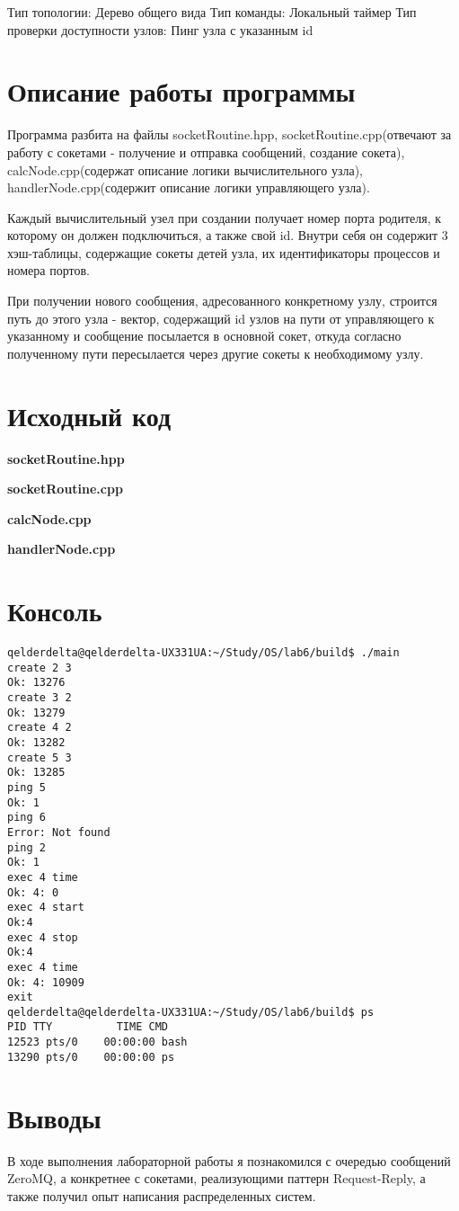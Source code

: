\documentclass[a4paper, 12pt]{article}
\begin{document}
Тип топологии: Дерево общего вида
Тип команды: Локальный таймер
Тип проверки доступности узлов: Пинг узла с указанным id

\section{Описание работы программы}

Программа разбита на файлы socketRoutine.hpp, socketRoutine.cpp(отвечают за работу с сокетами - получение и отправка сообщений, создание сокета), calcNode.cpp(содержат описание логики вычислительного узла), handlerNode.cpp\linebreak(содержит описание логики управляющего узла).

Каждый вычислительный узел при создании получает номер порта родителя, к которому он должен подключиться, а также свой id. Внутри себя он содержит 3 хэш-таблицы, содержащие сокеты детей узла, их идентификаторы процессов и номера портов.

При получении нового сообщения, адресованного конкретному узлу, строится путь до этого узла - вектор, содержащий id узлов на пути от управляющего к указанному и сообщение посылается в основной сокет, откуда согласно полученному пути пересылается через другие сокеты к необходимому узлу.
\newpage

\section{Исходный код}
\textbf{\large{socketRoutine.hpp}}


\textbf{\large{socketRoutine.cpp}}


\textbf{\large{calcNode.cpp}}


\textbf{\large{handlerNode.cpp}}

\newpage
\section{Консоль}

\begin{verbatim}
qelderdelta@qelderdelta-UX331UA:~/Study/OS/lab6/build$ ./main
create 2 3
Ok: 13276
create 3 2
Ok: 13279
create 4 2
Ok: 13282
create 5 3
Ok: 13285
ping 5
Ok: 1
ping 6
Error: Not found
ping 2
Ok: 1
exec 4 time
Ok: 4: 0
exec 4 start
Ok:4
exec 4 stop
Ok:4
exec 4 time
Ok: 4: 10909
exit
qelderdelta@qelderdelta-UX331UA:~/Study/OS/lab6/build$ ps
PID TTY          TIME CMD
12523 pts/0    00:00:00 bash
13290 pts/0    00:00:00 ps

\end{verbatim}
\newpage
\section{Выводы}

В ходе выполнения лабораторной работы я познакомился с очередью сообщений ZeroMQ, а конкретнее с сокетами, реализующими паттерн Request-Reply, а также получил опыт написания распределенных систем.
\end{document}
